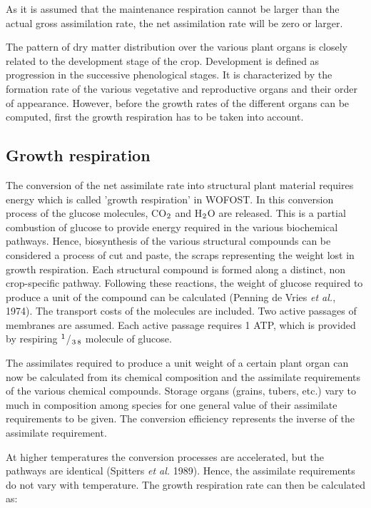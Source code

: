 As it is assumed that the maintenance respiration cannot be larger than the actual gross 
assimilation rate, the net assimilation rate will be zero or larger.

The pattern of dry matter distribution over the various plant organs is closely related to
the development stage of the crop. Development is defined as progression in the successive 
phenological stages. It is characterized by the formation rate of the various vegetative
and reproductive organs and their order of appearance. However, before the growth rates
of the different organs can be computed, first the growth respiration has to be taken into account.

\subsection{Growth respiration}

The conversion of the net assimilate rate into structural plant material requires energy which is
called 'growth respiration' in WOFOST.
In this conversion process of the glucose molecules, CO$_{{\rm 2}}$ and
H$_{{\rm 2}}$O are released. This is a partial combustion of glucose to provide energy required in
the various biochemical pathways. Hence, biosynthesis of the various structural compounds can 
be considered a process of cut and paste, the scraps representing the weight
lost in growth respiration.
Each structural compound is formed along a distinct, non crop-specific pathway.
Following these reactions, the weight of glucose required to produce a unit of the
compound can be calculated (Penning de Vries {\it et al.}, 1974). The transport costs of the
molecules are included. Two active passages of membranes are assumed. Each active
passage requires 1 ATP, which is provided by respiring $^{{\rm 1}}$/$_{{\rm 3}}$$_{{\rm 8}}$ molecule of glucose.

The assimilates required to produce a unit weight of a certain plant organ can now be
calculated from its chemical composition and the assimilate requirements of the various
chemical compounds. Storage organs (grains, tubers, etc.) vary to much in composition
among species for one general value of their assimilate requirements to be given. The
conversion efficiency represents the inverse of the assimilate requirement.

At higher temperatures the conversion processes are accelerated, but the pathways are
identical (Spitters {\it et al.} 1989). Hence, the assimilate requirements do not vary with
temperature. The growth respiration rate can then be calculated as:

